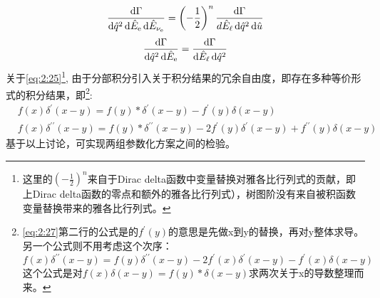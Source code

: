     \begin{equation}
        \frac{\mathrm{d} \Gamma}{\mathrm{d} \hat{q}^2 \, \mathrm{d} \hat{E}_{\mathrm{e}} \, \mathrm{d} \hat{E}_{\mathrm{\nu_e}}} = \left( - \frac{1}{2} \right)^n \frac{\mathrm{d} \Gamma}{d \hat{E}_{\mathrm{\ell}} \, \mathrm{d} \hat{q}^2 \, \mathrm{d} \hat{u}}
        \label{eq:2:25}
    \end{equation}    
    \begin{equation}
        \frac{\mathrm{d} \Gamma}{\mathrm{d} \hat{q}^2 \, \mathrm{d} \hat{E}_{\mathrm{e}}} = \frac{\mathrm{d} \Gamma}{ \mathrm{d} \hat{E}_{\mathrm{\ell}} \,  \mathrm{d}  \hat{q}^2}
        \label{eq:2:26}
    \end{equation}    
    关于\ref{eq:2:25}\footnote{这里的$(-\frac{1}{2})^{n}$来自于Dirac delta函数中变量替换对雅各比行列式的贡献，即上Dirac delta函数的零点和额外的雅各比行列式），树图阶没有来自被积函数变量替换带来的雅各比行列式。}, 由于分部积分引入关于积分结果的冗余自由度，即存在多种等价形式的积分结果，即\footnote{\ref{eq:2:27}第二行的公式是的$f^{\prime}(y)$的意思是先做x到y的替换，再对y整体求导。另一个公式则不用考虑这个次序：$$f(x)\delta^{\prime\prime}(x-y)=f(y)\delta^{\prime\prime}(x-y)-2f^{\prime}(x)\delta^{\prime}(x-y)-f^{\prime}(x)\delta(x-y)$$这个公式是对$f(x) \delta(x-y)=f(y) * \delta(x-y)$求两次关于x的导数整理而来。}:
    \begin{equation}
    \begin{aligned}
    & f(x) \delta^{\prime}(x-y)=f(y) * \delta^{\prime}(x-y)-f^{\prime}(y) \delta(x-y) \\
    & f(x) \delta^{\prime \prime}(x-y)=f(y) * \delta^{\prime \prime}(x-y)-2 f^{\prime}(y) \delta^{\prime}(x-y)+f^{\prime \prime}(y) \delta(x-y)
    \end{aligned}
    \label{eq:2:27}
    \end{equation} 
    基于以上讨论，可实现两组参数化方案之间的检验。
